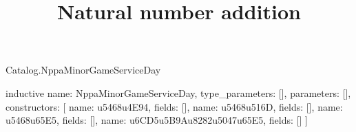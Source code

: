 \begin{lexlean}{Catalog.NppaMinorGameServiceDay}
\title{Natural number addition}
\begin{semanticmodule}
inductive{
  name: NppaMinorGameServiceDay,
  type_parameters: [],
  parameters: [],
  constructors: [
    {name: u5468u4E94, fields: []},
    {name: u5468u516D, fields: []},
    {name: u5468u65E5, fields: []},
    {name: u6CD5u5B9Au8282u5047u65E5, fields: []}
  ]
}
\end{semanticmodule}
\end{lexlean}
